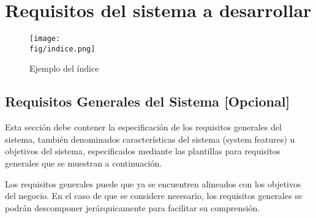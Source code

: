 \section{Requisitos del sistema a desarrollar}


 \begin{figure}[H]
 \centering
\texttt{[image: \\fig/indice.png]}
 \caption{Ejemplo del índice}
 \end{figure}
 

\subsection{Requisitos Generales del Sistema [Opcional]}


 \begin{textoazul}
 Esta sección debe contener la especificación de los requisitos generales del sistema, también denominados características del sistema (system features) u objetivos del sistema, especificados mediante las  plantillas para requisitos generales que se muestran a continuación.
 

Los requisitos generales puede que ya se encuentren alineados con los objetivos del negocio. En el caso de que se considere necesario, los requisitos generales se podrán descomponer jerárquicamente para facilitar su comprensión.

\end{textoazul}

